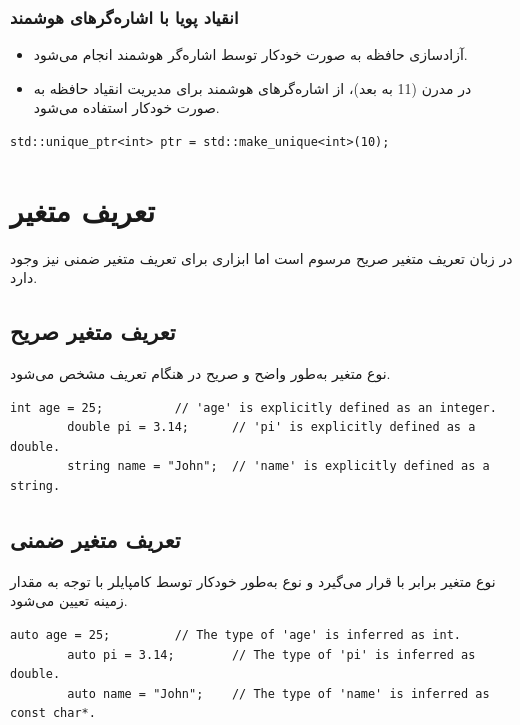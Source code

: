 \documentclass[12pt, a4paper]{report}
\begin{document}
\subsubsection{انقیاد پویا با اشاره‌گرهای هوشمند}
\begin{itemize}
	\item آزادسازی حافظه به صورت خودکار توسط اشاره‌گر هوشمند انجام می‌شود.
	\item در  مدرن (11 به بعد)، از اشاره‌گرهای هوشمند برای مدیریت انقیاد حافظه به صورت خودکار استفاده می‌شود.
\end{itemize}

\begin{LTR} %
	\begin{lstlisting}[breaklines=true]
		std::unique_ptr<int> ptr = std::make_unique<int>(10);
	\end{lstlisting}
\end{LTR}


\section{تعریف متغیر}
در زبان تعریف متغیر صریح مرسوم است اما ابزاری برای تعریف متغیر ضمنی نیز وجود دارد.

\subsection{تعریف متغیر صریح}
نوع متغیر به‌طور واضح و صریح در هنگام تعریف مشخص می‌شود.

\begin{LTR} %
	\begin{lstlisting}[breaklines=true]
		int age = 25;          // 'age' is explicitly defined as an integer.
		double pi = 3.14;      // 'pi' is explicitly defined as a double.
		string name = "John";  // 'name' is explicitly defined as a string.
	\end{lstlisting}
\end{LTR}

\subsection{تعریف متغیر ضمنی}
نوع متغیر برابر با  قرار می‌گیرد و نوع به‌طور خودکار توسط کامپایلر با توجه به مقدار زمینه تعیین می‌شود.

\begin{LTR} %
	\begin{lstlisting}[breaklines=true]
		auto age = 25;         // The type of 'age' is inferred as int.
		auto pi = 3.14;        // The type of 'pi' is inferred as double.
		auto name = "John";    // The type of 'name' is inferred as const char*.
	\end{lstlisting}
\end{LTR}
\end{document}
